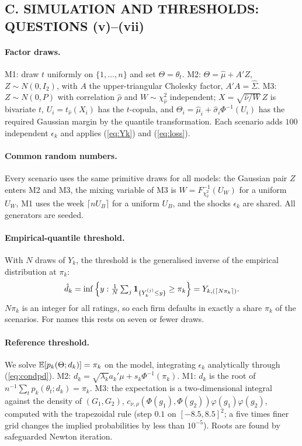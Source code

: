 \subsection*{C. SIMULATION AND THRESHOLDS: QUESTIONS (v)--(vii)}
\paragraph{Factor draws.} M1: draw $t$ uniformly on $\{1,\dots,n\}$ and set $\Theta=\theta_t$. M2: $\Theta=\hat\mu+A'Z$, $Z\sim N(0,I_2)$, with $A$ the upper-triangular Cholesky factor, $A'A=\hat\Sigma$. M3: $Z\sim N(0,P)$ with correlation $\hat\rho$ and $W\sim\chi^2_{\hat\nu}$ independent; $X=\sqrt{\hat\nu/W}\,Z$ is bivariate $t$, $U_i=t_{\hat\nu}(X_i)$ has the $t$-copula, and $\Theta_i=\hat\mu_i+\hat\sigma_i\Phi^{-1}(U_i)$ has the required Gaussian margin by the quantile transformation. Each scenario adds $100$ independent $\epsilon_k$ and applies (\ref{eq:Yk}) and (\ref{eq:loss}).

\paragraph{Common random numbers.} Every scenario uses the same primitive draws for all models: the Gaussian pair $Z$ enters M2 and M3, the mixing variable of M3 is $W=F^{-1}_{\chi^2_{\hat\nu}}(U_W)$ for a uniform $U_W$, M1 uses the week $\lceil nU_B\rceil$ for a uniform $U_B$, and the shocks $\epsilon_k$ are shared. All generators are seeded.

\paragraph{Empirical-quantile threshold.} With $N$ draws of $Y_k$, the threshold is the generalised inverse of the empirical distribution at $\pi_k$:
\[
\hat d_k=\inf\Big\{y:\tfrac1N\textstyle\sum_j\mathbf{1}_{\{Y_k^{(j)}\le y\}}\ge\pi_k\Big\}=Y_{k,(\lceil N\pi_k\rceil)} .
\]
$N\pi_k$ is an integer for all ratings, so each firm defaults in exactly a share $\pi_k$ of the scenarios. For  names this rests on seven or fewer draws.

\paragraph{Reference threshold.} We solve $\mathbb{E}[p_k(\Theta;d_k)]=\pi_k$ on the model, integrating $\epsilon_k$ analytically through (\ref{eq:condpd}). M2: $d_k=\sqrt{\lambda_k}a_k'\mu+s_k\Phi^{-1}(\pi_k)$. M1: $d_k$ is the root of $n^{-1}\sum_t p_k(\theta_t;d_k)=\pi_k$. M3: the expectation is a two-dimensional integral against the density of $(G_1,G_2)$, $c_{\nu,\rho}(\Phi(g_1),\Phi(g_2))\varphi(g_1)\varphi(g_2)$, computed with the trapezoidal rule (step $0.1$ on $[-8.5,8.5]^2$; a five times finer grid changes the implied probabilities by less than $10^{-5}$). Roots are found by safeguarded Newton iteration.

